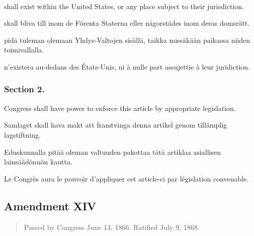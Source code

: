 \documentclass[a4paper,landscape,12pt]{article}
\begin{document}
~

\begin{minipage}[t]{0.22\textwidth}
shall exist within the United States, or any place subject to their jurisdiction.	
\end{minipage}\textwidth
\begin{minipage}[t]{0.22\textwidth}
skall bliva till inom de Förenta Staterna eller någorstädes inom deras domsrätt.	
\end{minipage}\textwidth
\begin{minipage}[t]{0.22\textwidth}
pidä tuleman olemaan Yhdys-Valtojen sisällä, taikka missäkään paikassa niiden toimivallalla.
\end{minipage}\textwidth
\begin{minipage}[t]{0.22\textwidth}
n'existera au-dedans des États-Unis, ni à nulle part assujettie à leur juridiction.
\end{minipage}

\subsubsection*{Section 2.}
\begin{minipage}[t]{0.22\textwidth}
Congress shall have power to enforce this article by appropriate legislation.
\end{minipage}\textwidth
\begin{minipage}[t]{0.22\textwidth}
Samlaget skall hava makt att framtvinga denna artikel genom tillämplig lagstiftning.
\end{minipage}\textwidth
\begin{minipage}[t]{0.22\textwidth}
Eduskunnalla pitää oleman valtuuden pakottaa tätä artiklaa asiallisen lainsäädönnön kautta.
\end{minipage}\textwidth
\begin{minipage}[t]{0.22\textwidth}
Le Congrès aura le pouvoir d'appliquer cet article-ci par législation convenable.
\end{minipage}



\subsection*{Amendment XIV}
\begin{quote}\small
	Passed by Congress June 13, 1866. Ratified July 9, 1868.
\end{quote}
\end{document}
